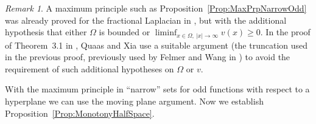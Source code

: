 \documentclass[12pt,reqno]{amsart}
\theoremstyle{definition}
\theoremstyle{remark}
\newtheorem{remark}[theorem]{Remark}
\numberwithin{equation}{section}
\begin{document}
\begin{remark}
	A maximum principle such as Proposition~\ref{Prop:MaxPrpNarrowOdd} was already proved for the fractional Laplacian in \cite{ChenLiLi}, but with the additional hypothesis that either $\Omega$ is bounded or $\liminf_{x\in  \Omega,\ |x|\to \infty} v(x) \geq 0$. In the proof of Theorem~3.1 in \cite{QuaasXia}, Quaas and Xia use a suitable argument (the truncation used in the previous proof, previously used by Felmer and Wang in \cite{FelmerWang}) to avoid the requirement of such additional hypotheses on $\Omega$ or $v$.
\end{remark}

With the maximum principle in ``narrow'' sets for odd functions with respect to a hyperplane we can use the moving plane argument. Now we establish Proposition~\ref{Prop:MonotonyHalfSpace}.
\end{document}
